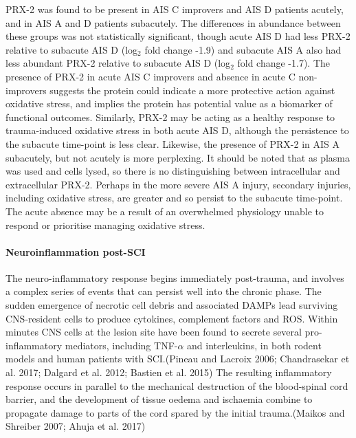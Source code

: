 \documentclass[9pt,lineno]{elife}
\begin{document}
PRX-2 was found to be present in AIS C improvers and AIS D patients acutely, and in AIS A and D patients subacutely.
The differences in abundance between these groups was not statistically significant, though acute AIS D had less PRX-2 relative to subacute AIS D (log\(_2\) fold change -1.9) and subacute AIS A also had less abundant PRX-2 relative to subacute AIS D (log\(_2\) fold change -1.7).
The presence of PRX-2 in acute AIS C improvers and absence in acute C non-improvers suggests the protein could indicate a more protective action against oxidative stress, and implies the protein has potential value as a biomarker of functional outcomes.
Similarly, PRX-2 may be acting as a healthy response to trauma-induced oxidative stress in both acute AIS D, although the persistence to the subacute time-point is less clear.
Likewise, the presence of PRX-2 in AIS A subacutely, but not acutely is more perplexing.
It should be noted that as plasma was used and cells lysed, so there is no distinguishing between intracellular and extracellular PRX-2.
Perhaps in the more severe AIS A injury, secondary injuries, including oxidative stress, are greater and so persist to the subacute time-point.
The acute absence may be a result of an overwhelmed physiology unable to respond or prioritise managing oxidative stress.

\hypertarget{neuroinflammation-post-sci}{%
\paragraph{Neuroinflammation post-SCI}\label{neuroinflammation-post-sci}}

The neuro-inflammatory response begins immediately post-trauma, and involves a complex series of events that can persist well into the chronic phase.
The sudden emergence of necrotic cell debris and associated DAMPs lead surviving CNS-resident cells to produce cytokines, complement factors and ROS.
Within minutes CNS cells at the lesion site have been found to secrete several pro-inflammatory mediators, including TNF-\(\alpha\) and interleukins, in both rodent models and human patients with SCI.(Pineau and Lacroix 2006; Chandrasekar et al. 2017; Dalgard et al. 2012; Bastien et al. 2015)
The resulting inflammatory response occurs in parallel to the mechanical destruction of the blood-spinal cord barrier, and the development of tissue oedema and ischaemia combine to propagate damage to parts of the cord spared by the initial trauma.(Maikos and Shreiber 2007; Ahuja et al. 2017)
\end{document}
